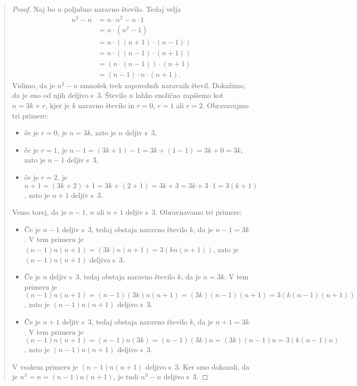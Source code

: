 \begin{quote}
  \begin{proof}
    Naj bo $n$ poljubno naravno število. Tedaj velja
    \begin{align*}
      n^3 - n
      &= n \cdot n^2 - n \cdot 1 \\
      &= n \cdot (n^2 - 1) \\
      &= n \cdot ((n + 1) \cdot (n - 1)) \\
      &= n \cdot ((n - 1) \cdot (n + 1)) \\
      &= (n \cdot (n - 1)) \cdot (n + 1) \\
      &= (n - 1) \cdot n \cdot (n + 1).
    \end{align*}
    Vidimo, da je $n^3 - n$ zmnožek treh zaporednih naravnih števil.
    Dokažimo, da je eno od njih deljivo s~$3$. Število $n$ lahko
    enolično zapišemo kot $n = 3 k + r$, kjer je $k$ naravno število
    in $r = 0$, $r = 1$ ali $r = 2$. Obravavajmo tri primere:
    \begin{itemize}
    \item če je $r = 0$, je $n = 3 k$, zato je $n$ deljiv s~$3$,
    \item če je $r = 1$, je $n - 1 = (3 k + 1) - 1 = 3 k + (1 - 1) = 3
      k + 0 = 3 k$, zato je $n-1$ deljiv s~$3$,
    \item če je $r = 2$, je $n + 1 = (3 k + 2) + 1 = 3 k + (2 + 1) = 3
      k + 3 = 3 k + 3 \cdot 1 = 3 (k +1)$, zato je $n+1$ deljiv s~$3$.
    \end{itemize}
    Vemo torej, da je $n - 1$, $n$ ali $n + 1$ deljiv s~$3$.
    Obravnavamo tri primere:
    \begin{itemize}
    \item Če je $n - 1$ deljiv s~$3$, tedaj  obstaja naravno število
      $k$, da je $n - 1 = 3 k$. V tem primeru je $(n - 1) n (n + 1) =
      (3 k) n (n + 1) = 3 (k n (n + 1))$, zato je $(n - 1) n (n + 1)$
      deljivo s~$3$.
    \item Če je $n$ deljiv s~$3$, tedaj obstaja naravno število $k$,
      da je $n = 3 k$. V tem primeru je $(n - 1) n (n + 1) = (n - 1)
      (3 k) n (n + 1) = (3 k) (n - 1) (n + 1) = 3 (k (n - 1) (n +
      1))$, zato je $(n - 1) n (n + 1)$ deljivo s~$3$.
    \item Če je $n + 1$ deljiv s~$3$, tedaj obstaja naravno število
      $k$, da je $n + 1 = 3 k$. V tem primeru je $(n - 1) n (n + 1) =
      (n - 1) n (3 k) = (n - 1) (3 k) n = (3 k) (n - 1) n = 3 (k (n -
      1) n)$, zato je $(n - 1) n (n + 1)$ deljivo s~$3$.
    \end{itemize}
    V vsakem primeru je $(n - 1) n (n + 1)$ deljivo s~$3$. Ker smo
    dokazali, da je $n^3 = n = (n - 1) n (n + 1)$, je tudi $n^3 - n$
    deljivo s~$3$.
  \end{proof}
\end{quote}

